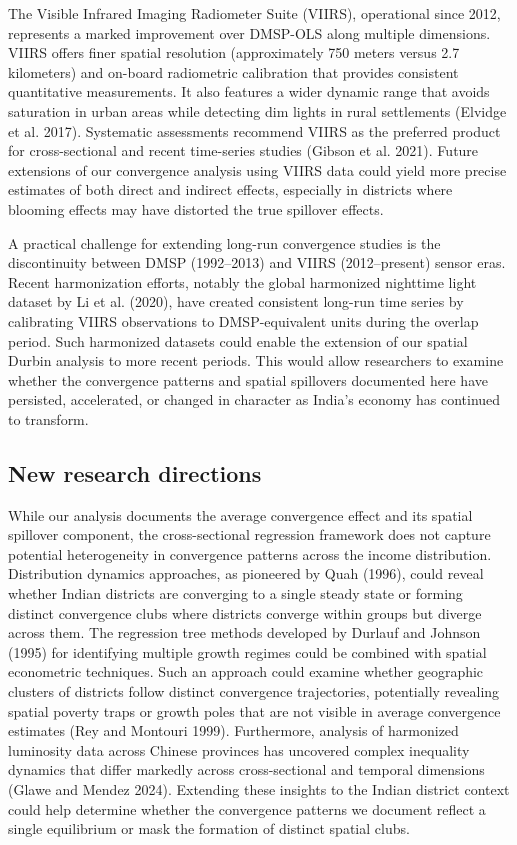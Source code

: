 \documentclass[
  letterpaper,
  DIV=11,
  numbers=noendperiod]{scrartcl}
\begin{document}
The Visible Infrared Imaging Radiometer Suite (VIIRS), operational since
2012, represents a marked improvement over DMSP-OLS along multiple
dimensions. VIIRS offers finer spatial resolution (approximately 750
meters versus 2.7 kilometers) and on-board radiometric calibration that
provides consistent quantitative measurements. It also features a wider
dynamic range that avoids saturation in urban areas while detecting dim
lights in rural settlements (Elvidge et al. 2017). Systematic
assessments recommend VIIRS as the preferred product for cross-sectional
and recent time-series studies (Gibson et al. 2021). Future extensions
of our convergence analysis using VIIRS data could yield more precise
estimates of both direct and indirect effects, especially in districts
where blooming effects may have distorted the true spillover effects.

A practical challenge for extending long-run convergence studies is the
discontinuity between DMSP (1992--2013) and VIIRS (2012--present) sensor
eras. Recent harmonization efforts, notably the global harmonized
nighttime light dataset by Li et al. (2020), have created consistent
long-run time series by calibrating VIIRS observations to
DMSP-equivalent units during the overlap period. Such harmonized
datasets could enable the extension of our spatial Durbin analysis to
more recent periods. This would allow researchers to examine whether the
convergence patterns and spatial spillovers documented here have
persisted, accelerated, or changed in character as India's economy has
continued to transform.

\subsection{New research directions}\label{new-research-directions}

While our analysis documents the average convergence effect and its
spatial spillover component, the cross-sectional regression framework
does not capture potential heterogeneity in convergence patterns across
the income distribution. Distribution dynamics approaches, as pioneered
by Quah (1996), could reveal whether Indian districts are converging to
a single steady state or forming distinct convergence clubs where
districts converge within groups but diverge across them. The regression
tree methods developed by Durlauf and Johnson (1995) for identifying
multiple growth regimes could be combined with spatial econometric
techniques. Such an approach could examine whether geographic clusters
of districts follow distinct convergence trajectories, potentially
revealing spatial poverty traps or growth poles that are not visible in
average convergence estimates (Rey and Montouri 1999). Furthermore,
analysis of harmonized luminosity data across Chinese provinces has
uncovered complex inequality dynamics that differ markedly across
cross-sectional and temporal dimensions (Glawe and Mendez 2024).
Extending these insights to the Indian district context could help
determine whether the convergence patterns we document reflect a single
equilibrium or mask the formation of distinct spatial clubs.
\end{document}
